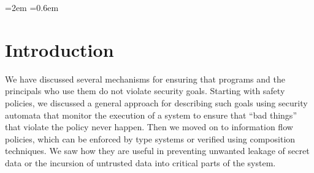 \documentclass[11pt,twoside]{scrartcl}
\begin{document}
\newcommand{\atrace}{\omega}%
\newcommand{\stdI}{\dTLint[state=\omega]}%
\newcommand{\Ip}{\dTLint[trace=\atrace]}%
\newcommand{\ws}{\omega}\newcommand{\wt}{\nu}%

\newcommand{\aff}[2]{\ensuremath{#1~\keywordfont{aff}~#2}}
\newcommand{\ownsr}{\ensuremath{\keywordfont{owns}}}
\newcommand{\isfac}{\ensuremath{\keywordfont{isFaculty}}}
\newcommand{\studof}{\ensuremath{\keywordfont{studentOf}}}
\newcommand{\canopen}{\ensuremath{\keywordfont{canOpen}}}
\newcommand{\matt}{\ensuremath{\keywordfont{mfredrik}}\xspace}
\newcommand{\tli}{\ensuremath{\keywordfont{tli2}}\xspace}
\newcommand{\admin}{\ensuremath{\keywordfont{admin}}\xspace}
\newcommand{\office}{\ensuremath{\keywordfont{cic2126}}\xspace}

\newdimen{\linferenceRulehskipamount}
\linferenceRulehskipamount=2em
  \linferenceRulevskipamount=0.6em


\lstset{escapechar=@,style=customc}

\maketitle
\thispagestyle{empty}


\section{Introduction}

We have discussed several mechanisms for ensuring that programs and the principals who use them do not violate security goals. Starting with safety policies, we discussed a general approach for describing such goals using security automata that monitor the execution of a system to ensure that ``bad things'' that violate the policy never happen. 
Then we moved on to information flow policies, which can be enforced by type systems or verified using composition techniques. We saw how they are useful in preventing unwanted leakage of secret data or the incursion of untrusted data into critical parts of the system.
\end{document}
